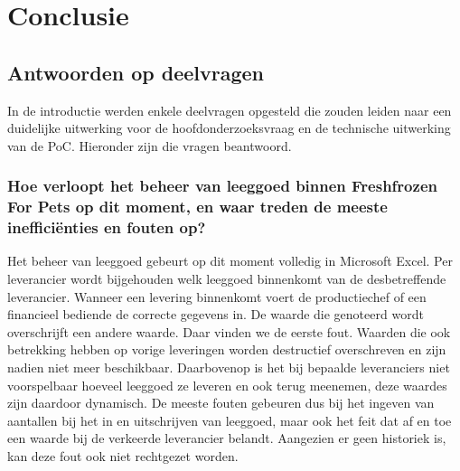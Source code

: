 
\chapter{Conclusie}%
\label{ch:conclusie}


\section{Antwoorden op deelvragen}

In de introductie werden enkele deelvragen opgesteld die zouden leiden naar een duidelijke uitwerking voor de hoofdonderzoeksvraag en de technische uitwerking van de PoC. Hieronder zijn die vragen beantwoord.

\subsection{Hoe verloopt het beheer van leeggoed binnen Freshfrozen For Pets op dit moment, en waar treden de meeste inefficiënties en fouten op?}

Het beheer van leeggoed gebeurt op dit moment volledig in Microsoft Excel. Per leverancier wordt bijgehouden welk leeggoed binnenkomt van de desbetreffende leverancier. Wanneer een levering binnenkomt voert de productiechef of een financieel bediende de correcte gegevens in. De waarde die genoteerd wordt overschrijft een andere waarde. Daar vinden we de eerste fout. Waarden die ook betrekking hebben op vorige leveringen worden destructief overschreven en zijn nadien niet meer beschikbaar. Daarbovenop is het bij bepaalde leveranciers niet voorspelbaar hoeveel leeggoed ze leveren en ook terug meenemen, deze waardes zijn daardoor dynamisch. De meeste fouten gebeuren dus bij het ingeven van aantallen bij het in en uitschrijven van leeggoed, maar ook het feit dat af en toe een waarde bij de verkeerde leverancier belandt. Aangezien er geen historiek is, kan deze fout ook niet rechtgezet worden.

